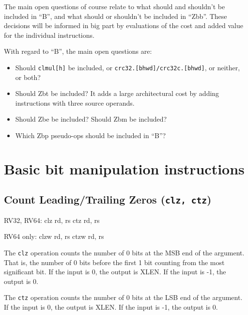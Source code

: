 The main open questions of course relate to what should and shouldn't be
included in ``B'', and what should or shouldn't be included in ``Zbb''.
These decisions will be informed in big part by evaluations of the cost and
added value for the individual instructions.

With regard to ``B'', the main open questions are:
\begin{itemize}
\item Should {\tt clmul[h]} be included, or {\tt crc32.[bhwd]/crc32c.[bhwd]}, or neither, or both?
\item Should Zbt be included? It adds a large architectural cost by adding instructions with three source operands.
\item Should Zbe be included? Should Zbm be included?
\item Which Zbp pseudo-ops should be included in ``B''?
\end{itemize}


\section{Basic bit manipulation instructions}


\subsection{Count Leading/Trailing Zeros (\texttt{clz, ctz})}

\begin{rvb}
  RV32, RV64:
    clz rd, rs
    ctz rd, rs

  RV64 only:
    clzw rd, rs
    ctzw rd, rs
\end{rvb}

The {\tt clz} operation counts the number of 0 bits at the MSB end of the
argument.  That is, the number of 0 bits before the first 1 bit counting from
the most significant bit. If the input is 0, the output is XLEN. If the input
is -1, the output is 0.

The {\tt ctz} operation counts the number of 0 bits at the LSB end of the
argument. If the input is 0, the output is XLEN. If the input is -1, the
output is 0.



